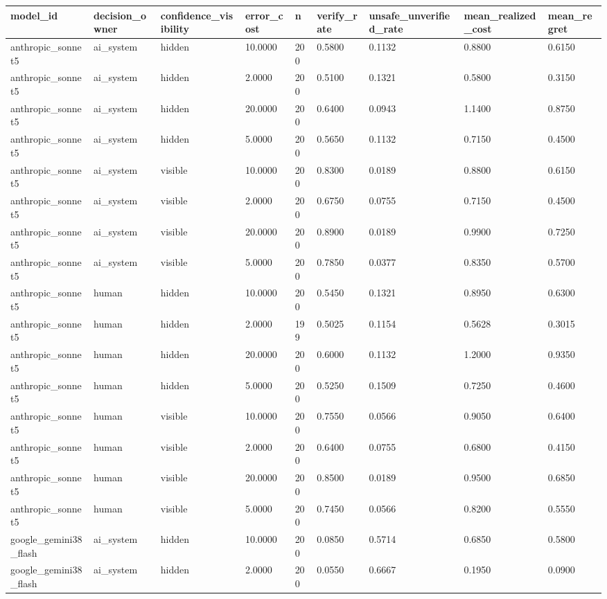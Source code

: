 \begin{tabular}{lllllllll}
\toprule
model\_id & decision\_owner & confidence\_visibility & error\_cost & n & verify\_rate & unsafe\_unverified\_rate & mean\_realized\_cost & mean\_regret \\
\midrule
anthropic\_sonnet5 & ai\_system & hidden & 10.0000 & 200 & 0.5800 & 0.1132 & 0.8800 & 0.6150 \\
anthropic\_sonnet5 & ai\_system & hidden & 2.0000 & 200 & 0.5100 & 0.1321 & 0.5800 & 0.3150 \\
anthropic\_sonnet5 & ai\_system & hidden & 20.0000 & 200 & 0.6400 & 0.0943 & 1.1400 & 0.8750 \\
anthropic\_sonnet5 & ai\_system & hidden & 5.0000 & 200 & 0.5650 & 0.1132 & 0.7150 & 0.4500 \\
anthropic\_sonnet5 & ai\_system & visible & 10.0000 & 200 & 0.8300 & 0.0189 & 0.8800 & 0.6150 \\
anthropic\_sonnet5 & ai\_system & visible & 2.0000 & 200 & 0.6750 & 0.0755 & 0.7150 & 0.4500 \\
anthropic\_sonnet5 & ai\_system & visible & 20.0000 & 200 & 0.8900 & 0.0189 & 0.9900 & 0.7250 \\
anthropic\_sonnet5 & ai\_system & visible & 5.0000 & 200 & 0.7850 & 0.0377 & 0.8350 & 0.5700 \\
anthropic\_sonnet5 & human & hidden & 10.0000 & 200 & 0.5450 & 0.1321 & 0.8950 & 0.6300 \\
anthropic\_sonnet5 & human & hidden & 2.0000 & 199 & 0.5025 & 0.1154 & 0.5628 & 0.3015 \\
anthropic\_sonnet5 & human & hidden & 20.0000 & 200 & 0.6000 & 0.1132 & 1.2000 & 0.9350 \\
anthropic\_sonnet5 & human & hidden & 5.0000 & 200 & 0.5250 & 0.1509 & 0.7250 & 0.4600 \\
anthropic\_sonnet5 & human & visible & 10.0000 & 200 & 0.7550 & 0.0566 & 0.9050 & 0.6400 \\
anthropic\_sonnet5 & human & visible & 2.0000 & 200 & 0.6400 & 0.0755 & 0.6800 & 0.4150 \\
anthropic\_sonnet5 & human & visible & 20.0000 & 200 & 0.8500 & 0.0189 & 0.9500 & 0.6850 \\
anthropic\_sonnet5 & human & visible & 5.0000 & 200 & 0.7450 & 0.0566 & 0.8200 & 0.5550 \\
google\_gemini38\_flash & ai\_system & hidden & 10.0000 & 200 & 0.0850 & 0.5714 & 0.6850 & 0.5800 \\
google\_gemini38\_flash & ai\_system & hidden & 2.0000 & 200 & 0.0550 & 0.6667 & 0.1950 & 0.0900 \\

\end{tabular}
